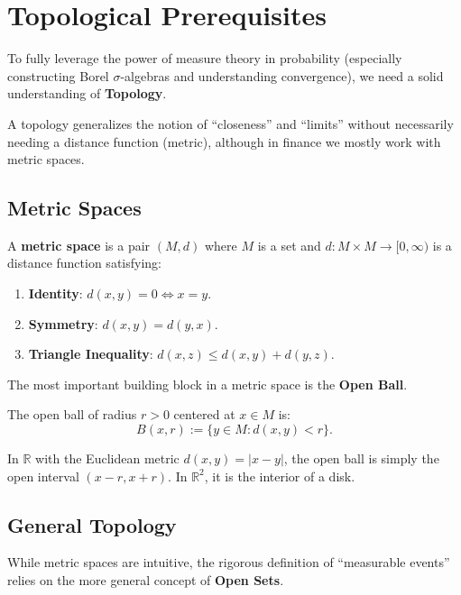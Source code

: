 \chapter{Topological Prerequisites}

To fully leverage the power of measure theory in probability (especially constructing Borel \texorpdfstring{$\sigma$-}{sigma-}algebras and understanding convergence), we need a solid understanding of \textbf{Topology}.

A topology generalizes the notion of ``closeness'' and ``limits'' without necessarily needing a distance function (metric), although in finance we mostly work with metric spaces.

\section{Metric Spaces}

\begin{definition}
A \textbf{metric space} is a pair $(M, d)$ where $M$ is a set and $d: M \times M \to [0, \infty)$ is a distance function satisfying:
\begin{enumerate}
    \item \textbf{Identity}: $d(x, y) = 0 \iff x = y$.
    \item \textbf{Symmetry}: $d(x, y) = d(y, x)$.
    \item \textbf{Triangle Inequality}: $d(x, z) \leq d(x, y) + d(y, z)$.
\end{enumerate}
\end{definition}

The most important building block in a metric space is the \textbf{Open Ball}.

\begin{definition}
The open ball of radius $r > 0$ centered at $x \in M$ is:
\[
B(x, r) := \{ y \in M : d(x, y) < r \}.
\]
\end{definition}

In $\mathbb{R}$ with the Euclidean metric $d(x, y) = |x - y|$, the open ball is simply the open interval $(x-r, x+r)$. In $\mathbb{R}^2$, it is the interior of a disk.

\section{General Topology}

While metric spaces are intuitive, the rigorous definition of ``measurable events'' relies on the more general concept of \textbf{Open Sets}.

